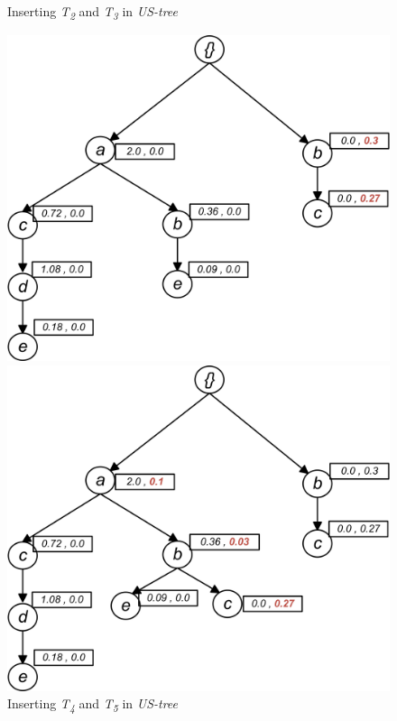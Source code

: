 \begin{figure}
\begin{minipage}{0.40\textwidth}
\end{minipage}
 \caption{Inserting \emph{T\textsubscript{2}} and \emph{T\textsubscript{3}} in \emph{US-tree}}
 \label{figure:t23}
\end{figure}

\begin{figure}
\begin{minipage}{0.50\textwidth}
  \centering
  \includegraphics[width=\textwidth]{images/sim_04.jpg}
\end{minipage}
\hfill
\begin{minipage}{0.50\textwidth}
  \centering
  \includegraphics[width=\textwidth]{images/sim_05.jpg}
\end{minipage}
\caption{Inserting \emph{T\textsubscript{4}} and \emph{T\textsubscript{5}} in \emph{US-tree}}
 \label{figure:t456}
\end{figure}


